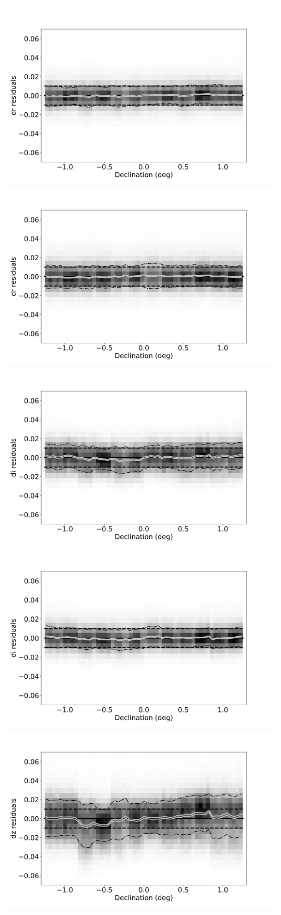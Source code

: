 \begin{figure}[th!]
    \centering\includegraphics[width=7cm]{figures/colorResidDES2bright_dr_Dec_Hess.png}
    \centering\includegraphics[width=7cm]{figures/colorResidPSDR2bright_dr_Dec_Hess.png}
    \centering\includegraphics[width=7cm]{figures/colorResidDES2bright_di_Dec_Hess.png}
    \centering\includegraphics[width=7cm]{figures/colorResidPSDR2bright_di_Dec_Hess.png}
    \centering\includegraphics[width=7cm]{figures/colorResidDES2bright_dz_Dec_Hess.png}

\end{figure}
